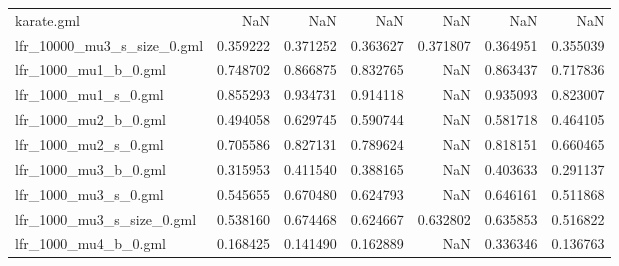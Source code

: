 \begin{tabular}{lrrrrrr}
karate.gml                 &                                 NaN &                            NaN &                               NaN &                           NaN &                             NaN &                                     NaN \\
lfr\_10000\_mu3\_s\_size\_0.gml &                            0.359222 &                       0.371252 &                          0.363627 &                      0.371807 &                        0.364951 &                                0.355039 \\
lfr\_1000\_mu1\_b\_0.gml       &                            0.748702 &                       0.866875 &                          0.832765 &                           NaN &                        0.863437 &                                0.717836 \\
lfr\_1000\_mu1\_s\_0.gml       &                            0.855293 &                       0.934731 &                          0.914118 &                           NaN &                        0.935093 &                                0.823007 \\
lfr\_1000\_mu2\_b\_0.gml       &                            0.494058 &                       0.629745 &                          0.590744 &                           NaN &                        0.581718 &                                0.464105 \\
lfr\_1000\_mu2\_s\_0.gml       &                            0.705586 &                       0.827131 &                          0.789624 &                           NaN &                        0.818151 &                                0.660465 \\
lfr\_1000\_mu3\_b\_0.gml       &                            0.315953 &                       0.411540 &                          0.388165 &                           NaN &                        0.403633 &                                0.291137 \\
lfr\_1000\_mu3\_s\_0.gml       &                            0.545655 &                       0.670480 &                          0.624793 &                           NaN &                        0.646161 &                                0.511868 \\
lfr\_1000\_mu3\_s\_size\_0.gml  &                            0.538160 &                       0.674468 &                          0.624667 &                      0.632802 &                        0.635853 &                                0.516822 \\
lfr\_1000\_mu4\_b\_0.gml       &                            0.168425 &                       0.141490 &                          0.162889 &                           NaN &                        0.336346 &                                0.136763 \\

\end{tabular}
